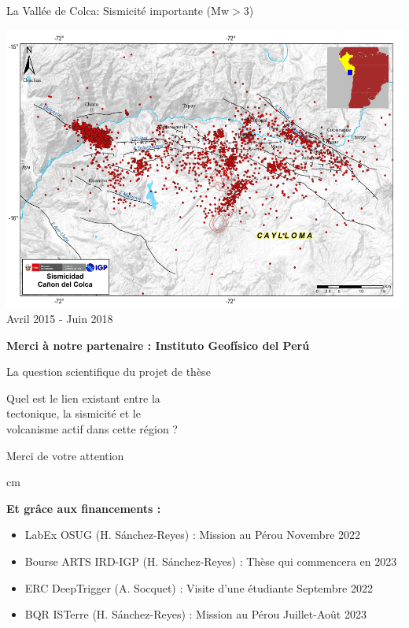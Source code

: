 \documentclass{beamer}
\begin{document}
\begin{frame}
 {La Vallée de Colca: Sismicité importante (Mw$>$3)}
 

 \begin{center}
  \vskip -0.5cm \includegraphics[width=0.9\linewidth]{images/red_colca_large.png}  \\
  Avril 2015 - Juin 2018  
 \end{center}

 \hfill {\bf \small Merci à notre partenaire : Instituto Geofísico del Perú}
 
\end{frame}

\begin{frame}
 {La question scientifique du projet de thèse}
 
 \LARGE \centering Quel est le lien existant entre la \\
 tectonique, la sismicité et le \\
 volcanisme actif dans cette région ?
 
 
\end{frame}



\begin{frame}
 
 \begin{center}
 {\huge  Merci de votre attention }
 \end{center}

  cm

 {\scriptsize
 {\bf Et grâce aux financements :} \\
 \begin{itemize}
  \item LabEx OSUG (H. Sánchez-Reyes) : Mission au Pérou Novembre 2022
  \item Bourse ARTS IRD-IGP (H. Sánchez-Reyes) : Thèse qui commencera en 2023 
  \item ERC DeepTrigger (A. Socquet) : Visite d'une étudiante Septembre 2022
  \item BQR ISTerre (H. Sánchez-Reyes) : Mission au Pérou Juillet-Août 2023
 \end{itemize}
}
 
\end{frame}
\end{document}
